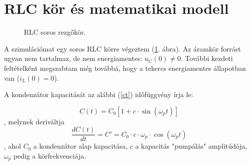 \documentclass[12pt,a4paper]{article}
\begin{document}
\section{RLC kör és matematikai modell}

\begin{figure}[H]
    \centering
    \caption{RLC soros rezgőkör.}
    \label{fig:rlc}
\end{figure}

A szimulációmat egy soros RLC körre végeztem (\ref{fig:rlc}. ábra). Az áramkör forrást ugyan nem tartalmaz, de nem energiamentes: $u_C(0) \ne 0$. További kezdeti feltételként
megszabtam még továbbá, hogy a tekercs energiamentes állapotban van ($i_L(0) = 0$).

A kondenzátor kapacitását az alábbi (\ref{ct}) időfüggvény írja le:

\begin{equation}
    C(t) = C_0 \left[1 + c \cdot \sin(\omega_p t)\right]
    \label{ct}
\end{equation}
, melynek deriváltja
\begin{equation}
    \frac{dC(t)}{dt} = {C}' = C_0 \cdot c \cdot \omega_p \cdot \cos(\omega_p t)
    \label{dct}
\end{equation}
, ahol $C_0$ a kondenzátor alap kapacitása, $c$ a kapacitás "pumpálás" amplitúdója, $\omega_p$ pedig a körfrekvenciája.
\end{document}
